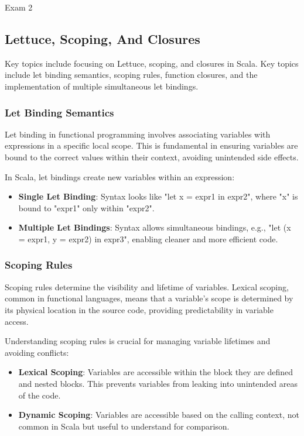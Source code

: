 \begin{examnotes}{Exam 2}
    \subsection*{Lettuce, Scoping, And Closures}

    Key topics include focusing on Lettuce, scoping, and closures in Scala. Key topics include let binding semantics, scoping rules, function closures, and the implementation of multiple simultaneous let bindings.
    
    \subsubsection*{Let Binding Semantics}

    Let binding in functional programming involves associating variables with expressions in a specific local scope. This is fundamental in ensuring variables are bound to the correct values within 
    their context, avoiding unintended side effects.
    
    \begin{highlight}
        In Scala, let bindings create new variables within an expression:
        \begin{itemize}
            \item \textbf{Single Let Binding}: Syntax looks like "let x = expr1 in expr2", where "x" is bound to "expr1" only within "expr2".
            \item \textbf{Multiple Let Bindings}: Syntax allows simultaneous bindings, e.g., "let (x = expr1, y = expr2) in expr3", enabling cleaner and more efficient code.
        \end{itemize}
    \end{highlight}
    
    \subsubsection*{Scoping Rules}
    
    Scoping rules determine the visibility and lifetime of variables. Lexical scoping, common in functional languages, means that a variable's scope is determined by its physical location in the 
    source code, providing predictability in variable access.
    
    \begin{highlight}
        Understanding scoping rules is crucial for managing variable lifetimes and avoiding conflicts:
        \begin{itemize}
            \item \textbf{Lexical Scoping}: Variables are accessible within the block they are defined and nested blocks. This prevents variables from leaking into unintended areas of the code.
            \item \textbf{Dynamic Scoping}: Variables are accessible based on the calling context, not common in Scala but useful to understand for comparison.
        \end{itemize}
    \end{highlight}
    

\end{examnotes}
